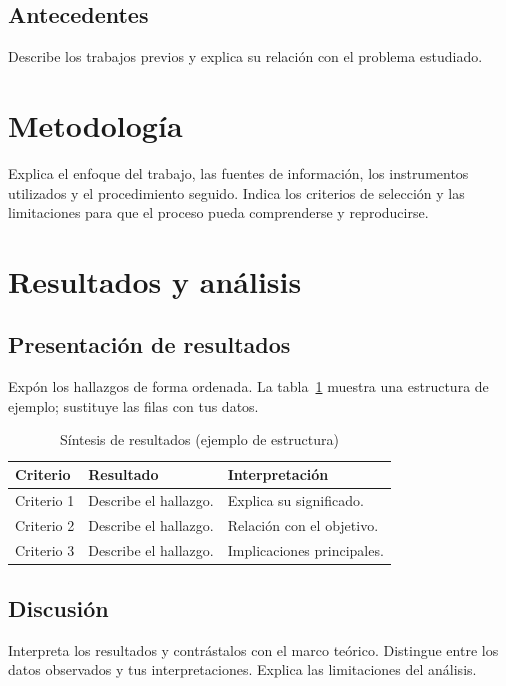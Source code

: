 \documentclass[12pt,letterpaper]{article}
\begin{document}
\subsection{Antecedentes}
Describe los trabajos previos y explica su relación con el problema estudiado.

\section{Metodología}
Explica el enfoque del trabajo, las fuentes de información, los instrumentos
utilizados y el procedimiento seguido. Indica los criterios de selección y
las limitaciones para que el proceso pueda comprenderse y reproducirse.

\section{Resultados y análisis}
\subsection{Presentación de resultados}
Expón los hallazgos de forma ordenada. La tabla~\ref{tab:resultados} muestra
una estructura de ejemplo; sustituye las filas con tus datos.
\begin{table}[htbp]
  \centering
  \caption{Síntesis de resultados (ejemplo de estructura)}
  \label{tab:resultados}
  \begin{tabularx}{\linewidth}{@{}lXX@{}}
    \toprule
    \textbf{Criterio} & \textbf{Resultado} & \textbf{Interpretación} \\
    \midrule
    Criterio 1 & Describe el hallazgo. & Explica su significado. \\
    Criterio 2 & Describe el hallazgo. & Relación con el objetivo. \\
    Criterio 3 & Describe el hallazgo. & Implicaciones principales. \\
    \bottomrule
  \end{tabularx}
  \par{}
\end{table}

\subsection{Discusión}
Interpreta los resultados y contrástalos con el marco teórico. Distingue entre
los datos observados y tus interpretaciones. Explica las limitaciones del análisis.
\end{document}
